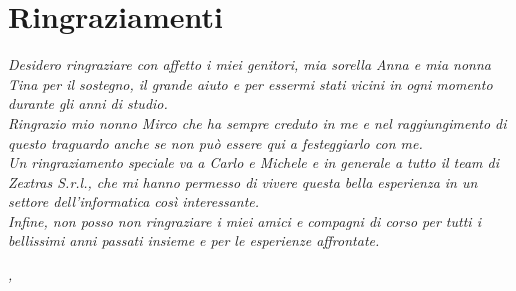 \cleardoublepage
{}
\thispagestyle{empty}


\begingroup
\let\clearpage\relax
\let\cleardoublepage\relax
\let\cleardoublepage\relax

\chapter*{Ringraziamenti}


\noindent \textit{Desidero ringraziare con affetto i miei genitori, mia sorella Anna e mia nonna Tina per il sostegno, il grande aiuto e per essermi stati vicini in ogni momento durante gli anni di studio.}\\

\noindent \textit{Ringrazio mio nonno Mirco che ha sempre creduto in me e nel raggiungimento di questo traguardo anche se non può essere qui a festeggiarlo con me.}\\

\noindent \textit{Un ringraziamento speciale va a Carlo e Michele e in generale a tutto il team di Zextras S.r.l., che mi hanno permesso di vivere questa bella esperienza in un settore dell’informatica così interessante.}\\

\noindent \textit{Infine, non posso non ringraziare i miei amici e compagni di corso per tutti i bellissimi anni passati insieme e per le esperienze affrontate.}
\bigskip
\bigskip
   
\noindent\textit{\myLocation, \myTime}
\hfill \myName

\endgroup
